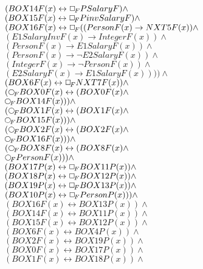 \documentclass[a4paper,10pt]{article}
\begin{document}
 $ (BOX14F(x) \leftrightarrow  \Box_{\!F} PSalaryF) \land $ \\ 
 $ (BOX15F(x) \leftrightarrow  \Box_{\!F} PinvSalaryF) \land $ \\ 
 $ (BOX16F(x) \leftrightarrow  \Box_{\!F} ((PersonF(x) \rightarrow NXT5F(x)) \land $ \\ 
 $ (E1SalaryInvF(x) \rightarrow IntegerF(x)) \land $ \\ 
 $ (PersonF(x) \rightarrow E1SalaryF(x)) \land $ \\ 
 $ (PersonF(x) \rightarrow  \lnot E2SalaryF(x)) \land $ \\ 
 $ (IntegerF(x) \rightarrow  \lnot PersonF(x)) \land $ \\ 
 $ (E2SalaryF(x) \rightarrow E1SalaryF(x)))) \land $ \\ 
 $ (BOX6F(x) \leftrightarrow  \Box_{\!F} NXT7F(x)) \land $ \\ 
 $ ( \Rnext BOX0F(x) \leftrightarrow (BOX0F(x) \land $ \\ 
 $  \Rnext BOX14F(x))) \land $ \\ 
 $ ( \Rnext BOX1F(x) \leftrightarrow (BOX1F(x) \land $ \\ 
 $  \Rnext BOX15F(x))) \land $ \\ 
 $ ( \Rnext BOX2F(x) \leftrightarrow (BOX2F(x) \land $ \\ 
 $  \Rnext BOX16F(x))) \land $ \\ 
 $ ( \Rnext BOX8F(x) \leftrightarrow (BOX8F(x) \land $ \\ 
 $  \Rnext PersonF(x))) \land $ \\ 
 $ (BOX17P(x) \leftrightarrow  \Box_{\!F} BOX11P(x)) \land $ \\ 
 $ (BOX18P(x) \leftrightarrow  \Box_{\!F} BOX12P(x)) \land $ \\ 
 $ (BOX19P(x) \leftrightarrow  \Box_{\!F} BOX13P(x)) \land $ \\ 
 $ (BOX10P(x) \leftrightarrow  \Box_{\!F} PersonP(x))) \land $ \\ 
 $ (BOX16F(x) \leftrightarrow BOX13P(x)) \land $ \\ 
 $ (BOX14F(x) \leftrightarrow BOX11P(x)) \land $ \\ 
 $ (BOX15F(x) \leftrightarrow BOX12P(x)) \land $ \\ 
 $ (BOX6F(x) \leftrightarrow BOX4P(x)) \land $ \\ 
 $ (BOX2F(x) \leftrightarrow BOX19P(x)) \land $ \\ 
 $ (BOX0F(x) \leftrightarrow BOX17P(x)) \land $ \\ 
 $ (BOX1F(x) \leftrightarrow BOX18P(x)) \land $ \\ 
\end{document}
